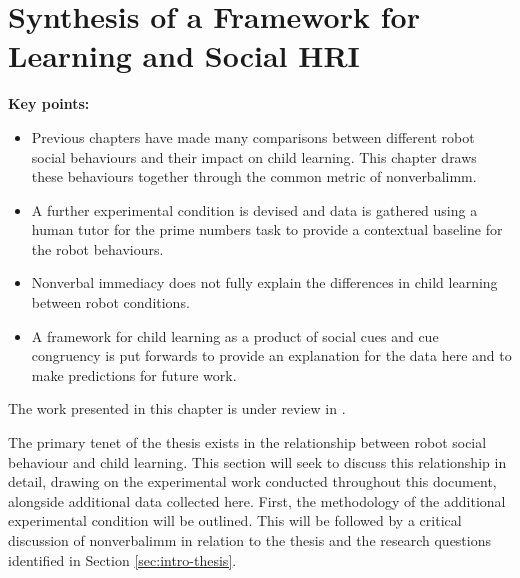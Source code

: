 \chapter{Synthesis of a Framework for Learning and Social HRI} \label{chap:behavemodel}

\begin{framed}
	\textbf{Key points:}
	
	\begin{itemize}
	\item Previous chapters have made many comparisons between different robot social behaviours and their impact on child \gls{learning}. This chapter draws these behaviours together through the common metric of \gls{nonverbalimm}.
	\item A further experimental condition is devised and data is gathered using a human tutor for the prime numbers task to provide a contextual baseline for the robot behaviours.
	\item Nonverbal immediacy does not fully explain the differences in child \gls{learning} between robot conditions.
	\item A framework for child \gls{learning} as a product of social cues and cue congruency is put forwards to provide an explanation for the data here and to make predictions for future work.
	\end{itemize}
\end{framed}

The work presented in this chapter is under review in \cite{kennedy2016impact}.

\newpage
The primary tenet of the thesis exists in the relationship between robot social behaviour and child \gls{learning}. This section will seek to discuss this relationship in detail, drawing on the experimental work conducted throughout this document, alongside additional data collected here. First, the methodology of the additional experimental condition will be outlined. This will be followed by a critical discussion of \gls{nonverbalimm} in relation to the thesis and the research questions identified in Section \ref{sec:intro-thesis}.

